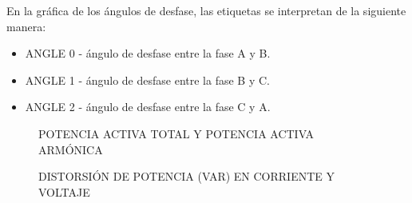     En la gráfica de los ángulos de desfase, las etiquetas se interpretan de la siguiente manera:
    \begin{itemize}
      \itemsep0em
      \item ANGLE 0 - ángulo de desfase entre la fase A y B.
      \item ANGLE 1 - ángulo de desfase entre la fase B y C.
      \item ANGLE 2 - ángulo de desfase entre la fase C y A.
    \end{itemize}
    \begin{figure}[H]
      \hfill
      \hfill
      \hfill
      \caption{POTENCIA ACTIVA TOTAL Y POTENCIA ACTIVA ARMÓNICA}
      \end{figure}
    \begin{figure}[H]
      \hfill
      \hfill
      \hfill
      \caption{DISTORSIÓN DE POTENCIA (VAR) EN CORRIENTE Y VOLTAJE}
      \end{figure}
